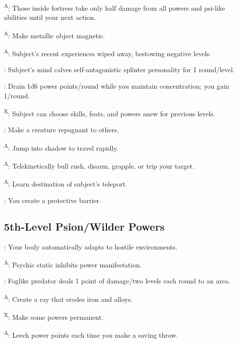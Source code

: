 \textsuperscript{A}: Those inside fortress take only half damage from all powers and psi-like abilities until your next action.

\textsuperscript{A}: Make metallic object magnetic.

\textsuperscript{A}: Subject's recent experiences wiped away, bestowing negative levels.

: Subject's mind calves self-antagonistic splinter personality for 1 round/level.

: Drain 1d6 power points/round while you maintain concentration; you gain 1/round.

\textsuperscript{X}: Subject can choose skills, feats, and powers anew for previous levels.

: Make a creature repugnant to others.

\textsuperscript{A}: Jump into shadow to travel rapidly.

\textsuperscript{A}: Telekinetically bull rush, disarm, grapple, or trip your target.

\textsuperscript{A}: Learn destination of subject's teleport.

: You create a protective barrier.




\subsection{5th-Level Psion/Wilder Powers}

: Your body automatically adapts to hostile environments.

\textsuperscript{A}: Psychic static inhibits power manifestation.

: Foglike predator deals 1 point of damage/two levels each round to an area.

\textsuperscript{A}: Create a ray that erodes iron and alloys.

\textsuperscript{X}: Make some powers permanent.

\textsuperscript{A}: Leech power points each time you make a saving throw.

